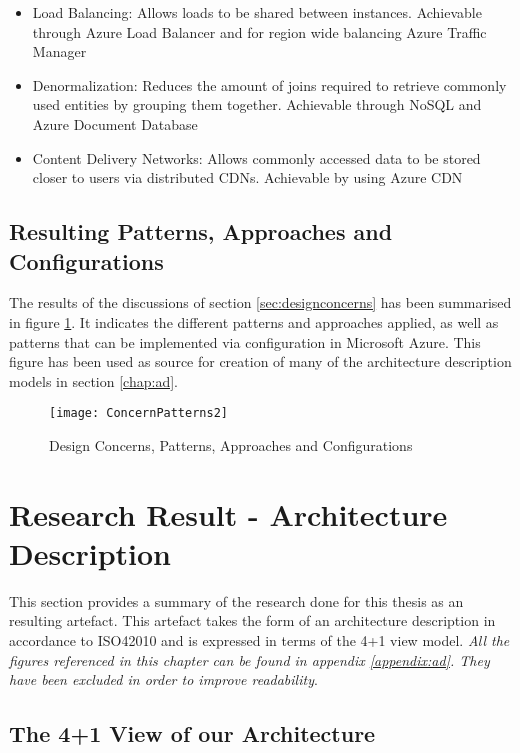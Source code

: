 \begin{itemize}
\item Load Balancing: Allows loads to be shared between instances. Achievable through Azure Load Balancer and for region wide balancing Azure Traffic Manager
\item Denormalization: Reduces the amount of joins required to retrieve commonly used entities by grouping them together. Achievable through NoSQL and Azure Document Database
\item Content Delivery Networks: Allows commonly accessed data to be stored closer to users via distributed CDNs. Achievable by using Azure CDN
\end{itemize}

\subsection{Resulting Patterns, Approaches and Configurations}
The results of the discussions of section \ref{sec:designconcerns} has been summarised in figure \ref{fig:concernpatterns}. It indicates the different patterns and approaches applied, as well as patterns that can be implemented via configuration in Microsoft Azure. This figure has been used as source for creation of many of the architecture description models in section \ref{chap:ad}.


\begin{figure}
\centering
\texttt{[image: ConcernPatterns2]}
\caption{Design Concerns, Patterns, Approaches and Configurations}
\label{fig:concernpatterns}
\end{figure}



\section{Research Result - Architecture Description}
\label{chap:ad}
This section provides a summary of the research done for this thesis as an resulting artefact. This artefact takes the form of an architecture description in accordance to ISO42010 and is expressed in terms of the 4+1 view model. \textit{All the figures referenced in this chapter can be found in appendix \ref{appendix:ad}. They have been excluded in order to improve readability}.

\subsection{The 4+1 View of our Architecture}

